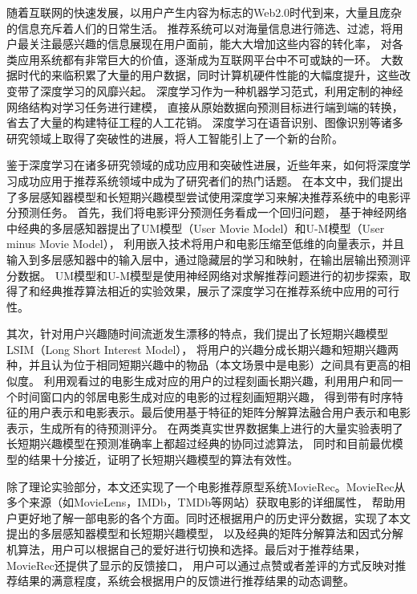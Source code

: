 \begin{cabstract}
随着互联网的快速发展，以用户产生内容为标志的Web2.0时代到来，大量且庞杂的信息充斥着人们的日常生活。
推荐系统可以对海量信息进行筛选、过滤，将用户最关注最感兴趣的信息展现在用户面前，能大大增加这些内容的转化率，
对各类应用系统都有非常巨大的价值，逐渐成为互联网平台中不可或缺的一环。
大数据时代的来临积累了大量的用户数据，同时计算机硬件性能的大幅度提升，这些改变带了深度学习的风靡兴起。
深度学习作为一种机器学习范式，利用定制的神经网络结构对学习任务进行建模，
直接从原始数据向预测目标进行端到端的转换，省去了大量的构建特征工程的人工花销。
深度学习在语音识别、图像识别等诸多研究领域上取得了突破性的进展，将人工智能引上了一个新的台阶。

鉴于深度学习在诸多研究领域的成功应用和突破性进展，近些年来，如何将深度学习成功应用于推荐系统领域中成为了研究者们的热门话题。
在本文中，我们提出了多层感知器模型和长短期兴趣模型尝试使用深度学习来解决推荐系统中的电影评分预测任务。
首先，我们将电影评分预测任务看成一个回归问题，
基于神经网络中经典的多层感知器提出了UM模型（User Movie Model）和U-M模型（User minus Movie Model），
利用嵌入技术将用户和电影压缩至低维的向量表示，并且输入到多层感知器中的输入层中，通过隐藏层的学习和映射，在输出层输出预测评分数据。
UM模型和U-M模型是使用神经网络对求解推荐问题进行的初步探索，取得了和经典推荐算法相近的实验效果，展示了深度学习在推荐系统中应用的可行性。

其次，针对用户兴趣随时间流逝发生漂移的特点，我们提出了长短期兴趣模型LSIM（Long Short Interest Model），
将用户的兴趣分成长期兴趣和短期兴趣两种，并且认为位于相同短期兴趣中的物品（本文场景中是电影）之间具有更高的相似度。
利用观看过的电影生成对应的用户的过程刻画长期兴趣，利用用户和同一个时间窗口内的邻居电影生成对应的电影的过程刻画短期兴趣，
得到带有时序特征的用户表示和电影表示。最后使用基于特征的矩阵分解算法融合用户表示和电影表示，生成所有的待预测评分。
在两类真实世界数据集上进行的大量实验表明了长短期兴趣模型在预测准确率上都超过经典的协同过滤算法，
同时和目前最优模型的结果十分接近，证明了长短期兴趣模型的算法有效性。

除了理论实验部分，本文还实现了一个电影推荐原型系统MovieRec。MovieRec从多个来源（如MovieLens，IMDb，TMDb等网站）获取电影的详细属性，
帮助用户更好地了解一部电影的各个方面。同时还根据用户的历史评分数据，实现了本文提出的多层感知器模型和长短期兴趣模型，
以及经典的矩阵分解算法和因式分解机算法，用户可以根据自己的爱好进行切换和选择。最后对于推荐结果，MovieRec还提供了显示的反馈接口，
用户可以通过点赞或者差评的方式反映对推荐结果的满意程度，系统会根据用户的反馈进行推荐结果的动态调整。
\end{cabstract}

